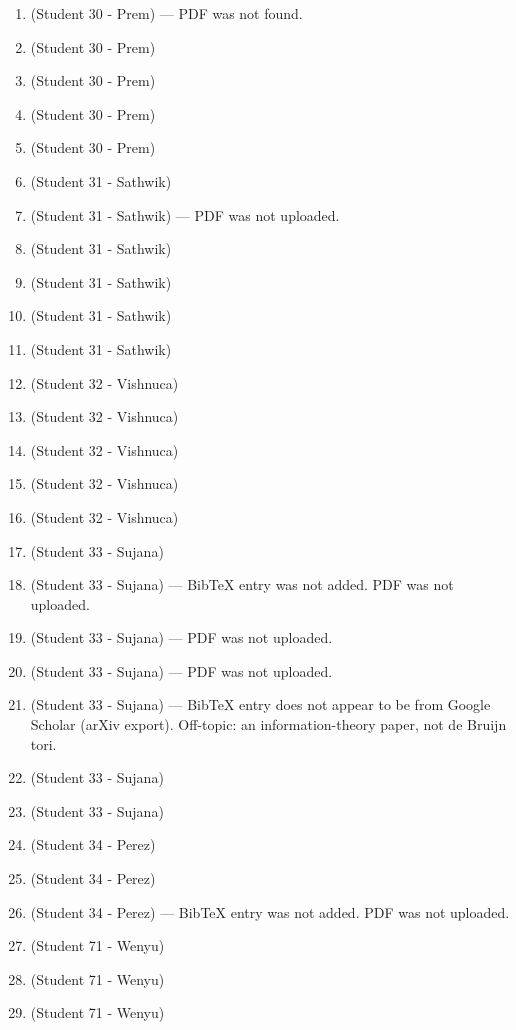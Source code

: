 \begin{enumerate}[label=\#\arabic*]
\item \cite{etzion1990pseudo} (Student 30 - Prem) --- PDF was not found.
\item \cite{ivanyi2013prism} (Student 30 - Prem)
\item \cite{xu2007robust} (Student 30 - Prem)
\item \cite{blakley2000two} (Student 30 - Prem)
\item \cite{huang2014fast} (Student 30 - Prem)
\item \cite{kreitzer2024alternating} (Student 31 - Sathwik)
\item \cite{ivanyi1990three} (Student 31 - Sathwik) --- PDF was not uploaded.
\item \cite{jia2021oneshot} (Student 31 - Sathwik)
\item \cite{jeught2013robust} (Student 31 - Sathwik)
\item \cite{ma2021bayesian} (Student 31 - Sathwik)
\item \cite{chee2022robust} (Student 31 - Sathwik)
\item \cite{clapham1986universal} (Student 32 - Vishnuca)
\item \cite{kim2008aperiodic} (Student 32 - Vishnuca)
\item \cite{van1979pseudo} (Student 32 - Vishnuca)
\item \cite{chee2025constructions} (Student 32 - Vishnuca)
\item \cite{calabro1967synthesis} (Student 32 - Vishnuca)
\item \cite{savage1997survey} (Student 33 - Sujana)
\item \cite{stevens2014coolest} (Student 33 - Sujana) --- BibTeX entry was not added. PDF was not uploaded.
\item \cite{voorhees2008remarks} (Student 33 - Sujana) --- PDF was not uploaded.
\item \cite{martinez2011reproducing} (Student 33 - Sujana) --- PDF was not uploaded.
\item \cite{klartag2024strongdataprocessinginequality} (Student 33 - Sujana) --- BibTeX entry does not appear to be from Google Scholar (arXiv export). Off-topic: an information-theory paper, not de Bruijn tori.
\item \cite{barber2010binary} (Student 33 - Sujana)
\item \cite{benk2025binary} (Student 33 - Sujana)
\item \cite{roig2021review} (Student 34 - Perez)
\item \cite{huang2023comprehensive} (Student 34 - Perez)
\item \cite{safaei2024graph} (Student 34 - Perez) --- BibTeX entry was not added. PDF was not uploaded.
\item \cite{becher2024nested} (Student 71 - Wenyu)
\item \cite{condon2024bruijn} (Student 71 - Wenyu)
\item \cite{etzion1999linear} (Student 71 - Wenyu)
\end{enumerate}

